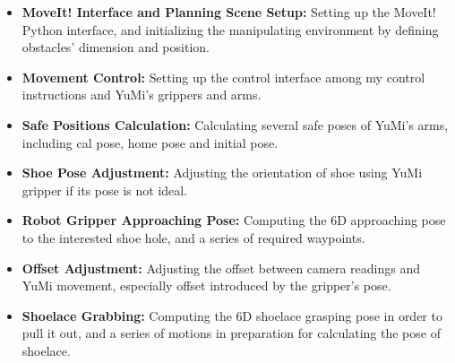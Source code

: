 \begin{itemize}
    \item \textbf{MoveIt! Interface and Planning Scene Setup:} Setting up the MoveIt! Python interface, and initializing the manipulating environment by defining obstacles' dimension and position.
    \item \textbf{Movement Control:} Setting up the control interface among my control instructions and YuMi's grippers and arms.
    \item \textbf{Safe Positions Calculation:} Calculating several safe poses of YuMi's arms, including cal pose, home pose and initial pose.
    \item \textbf{Shoe Pose Adjustment:} Adjusting the orientation of shoe using YuMi gripper if its pose is not ideal. 
    \item \textbf{Robot Gripper Approaching Pose:} Computing the 6D approaching pose to the interested shoe hole, and a series of required waypoints.
    \item \textbf{Offset Adjustment:} Adjusting the offset between camera readings and YuMi movement, especially offset introduced by the gripper's pose.
    \item \textbf{Shoelace Grabbing:} Computing the 6D shoelace grasping pose in order to pull it out, and a series of motions in preparation for calculating the pose of shoelace.
\end{itemize}



